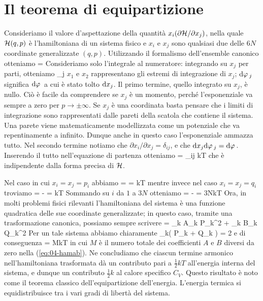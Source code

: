 \section{Il teorema di equipartizione}
\label{sec:04-equipart}

Consideriamo il valore d'aspettazione della quantità $x_i(\partial{\mathcal H}/\partial x_j)$, nella quale ${\mathcal H}(q,p)$ è l'hamiltoniana di un sistema fisico e $x_i$ e $x_j$ sono qualsiasi due delle $6N$ coordinate generalizzate $(q,p)$. Utilizzando il formalismo dell'ensemble canonico otteniamo
\be
{} = 
\ee
Consideriamo solo l'integrale al numeratore: integrando su $x_j$ per parti, otteniamo
\be
\int{}\de\varphi_j
\ee
$x_1$ e $x_2$ rappresentano gli estremi di integrazione di $x_j$; ${\textrm d}\varphi\,_j$ significa ${\textrm d}\varphi\,$ a cui è stato tolto ${\textrm d}x_j$. Il primo termine, quello integrato su $x_j$, è nullo. Ciò è facile da comprendere se $x_j$ è un momento, perché l'esponenziale va sempre a zero per $p\to\pm\infty$. Se $x_j$ è una coordinata basta pensare che i limiti di integrazione sono rappresentati dalle pareti della scatola che contiene il sistema. Una parete viene matematicamente modellizzata come un potenziale che va repentinamente a infinito. Dunque anche in questo caso l'esponenziale ammazza tutto. Nel secondo termine notiamo che $\partial x_i/\partial x_j = \delta_{ij}$, e che ${\textrm d}x_j{\textrm d}\varphi\,_j = {\textrm d}\varphi\,$. Inserendo il tutto nell'equazione di partenza otteniamo
\be
{} = \delta_{ij} kT
\ee
che è indipendente dalla forma precisa di ${\mathcal H}$.

Nel caso in cui $x_i = x_j = p_i$ abbiamo
\be
{} =  = kT
\ee
mentre invece nel caso $x_i = x_j = q_i$ troviamo
\be
{} = - = kT
\ee
Sommando su $i$ da $1$ a $3N$ otteniamo
\be
{} = - = 3NkT
\ee
Ora, in molti problemi fisici rilevanti l'hamiltoniana del sistema è una funzione quadratica delle sue coordinate generalizzate; in questo caso, tramite una trasformazione canonica, possiamo sempre scrivere
\be
\label{eq:04-hamab}
\Ham = \sum_k A_k P_k^2 + \sum_k B_k Q_k^2
\ee
Per un tale sistema abbiamo chiaramente
\be
\sum_k\left( P_k + Q_k \right) = 2\Ham
\ee
e di conseguenza
\be
\aspetta{\Ham} =  MkT
\ee
in cui $M$ è il numero totale dei coefficienti $A$ e $B$ diversi da zero nella (\ref{eq:04-hamab}). Ne concludiamo che ciascun termine armonico nell'hamiltoniana trasformata dà un contributo pari a $\frac{1}{2}kT$ all'energia interna del sistema, e dunque un contributo $\frac{1}{2}k$ al calore specifico $C_V$. Questo risultato è noto come il teorema classico dell'equipartizione dell'energia. L'energia termica si equidistribuisce tra i vari gradi di libertà del sistema.


